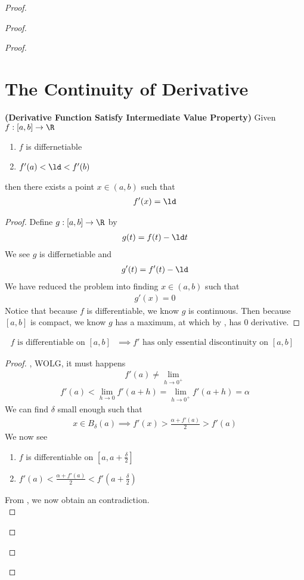 \documentclass{report}
\begin{document}
\begin{proof}
\begin{proof}
\begin{proof}
\section{The Continuity of Derivative} 
\begin{theorem}
\label{6.3.1}
\textbf{(Derivative Function Satisfy Intermediate Value Property)} Given $f:[a,b]\rightarrow \R$ 
\begin{enumerate}[label=(\alph*)]
  \item $f$ is differnetiable
  \item $f'(a)<\ld  < f'(b)$
\end{enumerate}
then there exists a point $x\in (a,b)$ such that 
\begin{align*}
f'(x)=\ld 
\end{align*}
\end{theorem}
\begin{proof}
Define $g:[a,b]\rightarrow \R$ by 
\begin{align*}
g(t)=f(t)-\ld t
\end{align*}
We see $g$ is differnetiable and 
\begin{align*}
g'(t)=f'(t)-\ld 
\end{align*}
We have reduced the problem into finding $x\in (a,b)$ such that 
\begin{align*}
g'(x)=0
\end{align*}
Notice that because $f$ is differentiable, we know $g$ is continuous. Then because $[a,b]$ is compact, we know $g$ has a maximum, at which by , has $0$ derivative.
\end{proof}
\begin{corollary}
\label{6.3.2}
\begin{align*}
f\text{ is differentiable on $[a,b]$ }\implies f'\text{ has only essential discontinuity on $[a,b]$ }
\end{align*}
\end{corollary}
\begin{proof}
  , WOLG, it must happens 
\begin{align*}
f'(a)\neq \lim_{h \to 0^+}
\end{align*}
\begin{align*}
f'(a)< \lim_{h \to 0}f'(a+h)=\lim_{h\to 0^+} f'(a+h)=\alpha 
\end{align*}
We can find $\delta$ small enough such that 
\begin{align*}
x\in B_{\delta}(a)\implies f'(x)>\frac{\alpha +f'(a)}{2}>f'(a)
\end{align*}
We now see 
\begin{enumerate}[label=(\alph*)]
  \item $f$ is differentiable on $[a,a+\frac{\delta}{2}]$ 
  \item  $f'(a)<\frac{\alpha +f'(a)}{2}<f'(a+\frac{\delta}{2})$ 
\end{enumerate}
From , we now obtain an contradiction. \CaC\\

\end{proof}
\end{proof}
\end{proof}
\end{proof}
\end{document}
